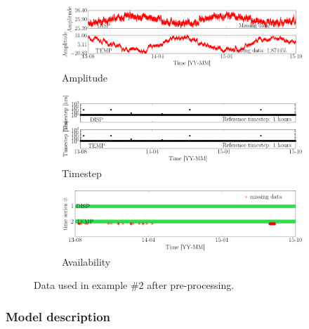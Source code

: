 \begin{figure}[h!]
\centering
\begin{subfigure}{\linewidth}
\includegraphics[width=0.9\linewidth]{./docfigs/Example_DISPTEMPSIM/preprocessed_default/ALL_AMPLITUDES.pdf} 
\caption{Amplitude}
\end{subfigure}
\begin{subfigure}{\linewidth}
\includegraphics[width=0.9\linewidth]{./docfigs/Example_DISPTEMPSIM/preprocessed_default/ALL_TIMESTEPS.pdf}
\caption{Timestep}
\end{subfigure}
\begin{subfigure}{\linewidth}
\includegraphics[width=0.9\linewidth]{./docfigs/Example_DISPTEMPSIM/preprocessed_default/AVAILABILITY.pdf}
\caption{Availability}
\end{subfigure}
\caption{Data used in example \#2 after pre-processing.}
\label{fig:DataSummaryDefaultPreProcessed2}
\end{figure}



\subsubsection{Model description}
\label{SS:ModelConstructionExample2}

